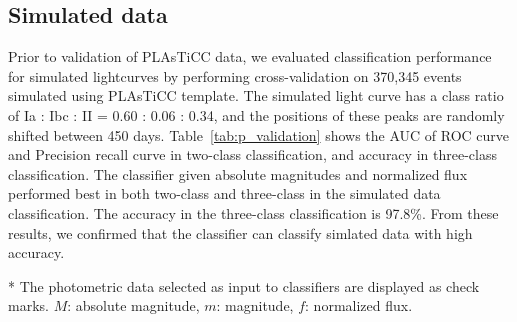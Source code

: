 \documentclass[useamsfonts]{pasj01}
\begin{document}
\subsection{Simulated data}
%
Prior to validation of PLAsTiCC data, we evaluated classification performance for simulated lightcurves by performing cross-validation on 370,345 events simulated using PLAsTiCC template.
The simulated light curve has a class ratio of Ia : Ibc : II = 0.60 : 0.06 : 0.34, and the positions of these peaks are randomly shifted between 450 days.
Table\ \ref{tab:p_validation} shows the AUC of ROC curve and Precision recall curve in two-class classification, and accuracy in three-class classification.
The classifier given absolute magnitudes and normalized flux performed best in both two-class and three-class in the simulated data classification.
The accuracy in the three-class classification is 97.8\%.
From these results, we confirmed that the classifier can classify simlated data with high accuracy.
%
%
%
%
\begin{table}[ht]
\label{tab:p_validation}
\begin{tabnote}
* The photometric data selected as input to classifiers are displayed as check marks.
$M$: absolute magnitude, $m$: magnitude, $f$: normalized flux.
\end{tabnote}
\end{table}
%
%
\end{document}
